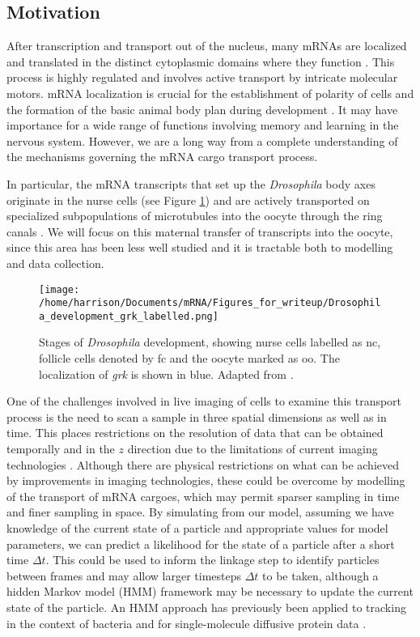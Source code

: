 \documentclass[twocolumn]{biophys}
\begin{document}
\subsection{Motivation}
After transcription and transport out of the nucleus, many mRNAs are localized and translated in the distinct cytoplasmic domains where they function \citep{jansen2001mrna, parton2014subcellular}.
This process is highly regulated and involves active transport by intricate molecular motors.
mRNA localization is crucial for the establishment of polarity of cells and the formation of the basic animal body plan during development \citep{wolpert1998}. 
It may have importance for a wide range of functions involving memory and learning in the nervous system. 
However, we are a long way from a complete understanding of the mechanisms governing the mRNA cargo transport process.

In particular, the mRNA transcripts that set up the \textit{Drosophila} body axes originate in the nurse cells (see Figure \ref{FIG:Drosophila_development}) and are actively transported on specialized subpopulations of microtubules into the oocyte through the ring canals \citep{clark2007dynein}.
We will focus on this maternal transfer of transcripts into the oocyte, since this area has been less well studied and it is tractable both to modelling and data collection.
\begin{figure}[h]
 \centering
 \texttt{[image: /home/harrison/Documents/mRNA/Figures\_for\_writeup/Drosophila\_development\_grk\_labelled.png]}
 \caption{Stages of \textit{Drosophila} development, showing nurse cells labelled as nc, follicle cells denoted by fc and the oocyte marked as oo. The localization of \textit{grk} is shown in blue. Adapted from \citet{lasko1999rna}.}
 \label{FIG:Drosophila_development}
\end{figure}

One of the challenges involved in live imaging of cells to examine this transport process is the need to scan a sample in three spatial dimensions as well as in time.
This places restrictions on the resolution of data that can be obtained temporally and in the $z$ direction due to the limitations of current imaging technologies \citep{weil2010making}.
Although there are physical restrictions on what can be achieved by improvements in imaging technologies, these could be overcome by modelling of the transport of mRNA cargoes, which may permit sparser sampling in time and finer sampling in space.
By simulating from our model, assuming we have knowledge of the current state of a particle and appropriate values for model parameters, we can predict a likelihood for the state of a particle after a short time $\Delta t$.
This could be used to inform the linkage step to identify particles between frames and may allow larger timesteps $\Delta t$ to be taken, although a hidden Markov model (HMM) framework may be necessary to update the current state of the particle.
An HMM approach has previously been applied to tracking in the context of bacteria \citep{rosser2013novel} and for single-molecule diffusive protein data \citep{persson2013extracting}.
\end{document}
